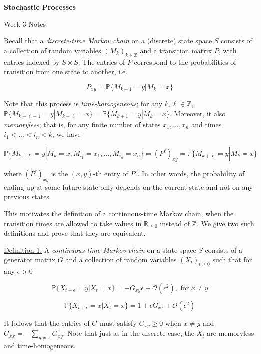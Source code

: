 \documentclass[10pt]{article}
\newcommand{\x}{\times}
\newcommand{\R}{\mathbb{R}}
\newcommand{\Z}{\mathbb{Z}}
\newcommand{\Prob}{\mathbb{P}}
\newcommand{\bigO}{\mathcal{O}}
\begin{document}
\begin{center}
\textbf{\Large Stochastic Processes}

{\large Week 3 Notes}
\end{center}

Recall that a \textit{discrete-time Markov chain} on a (discrete) state space $S$ consists of a collection of random variables $(M_k)_{k \in \Z}$ and a transition matrix $P$, with entries indexed by $S \x S$. The entries of $P$ correspond to the probabilities of transition from one state to another, i.e.

$$P_{xy}=\Prob\{M_{k+1}=y | M_k=x\}$$

Note that this process is \textit{time-homogeneous}; for any $k, \ell \in \Z$, $\Prob\{M_{k+\ell+1}=y | M_{k+\ell}=x\}=\Prob\{M_{k+1}=y | M_k=x\}$. Moreover, it also \textit{memoryless}; that is, for any finite number of states $x_1,...,x_n$ and times $i_1<...<i_n<k$, we have

$$\Prob\{M_{k+\ell}=y | M_k=x, M_{i_1}=x_1, ..., M_{i_n}=x_n\}=(P^\ell)_{xy}=\Prob\{M_{k+\ell}=y | M_k=x\}$$

where $(P^\ell)_{xy}$ is the $(x,y)$-th entry of $P^\ell$. In other words, the probability of ending up at some future state only depends on the current state and not on any previous states.

This motivates the definition of a continuous-time Markov chain, when the transition times are allowed to take values in $\R_{\geq 0}$ instead of $\Z$. We give two such definitions and prove that they are equivalent.

\hfill

\noindent \underline{Definition 1:} A \textit{continuous-time Markov chain} on a state space $S$ consists of a generator matrix $G$ and a collection of random variables $(X_t)_{t \geq 0}$ such that for any $\epsilon>0$

$$\Prob\{X_{t+\epsilon}=y | X_t=x \}=-G_{xy} \epsilon+\bigO(\epsilon^2), \text{     for } x \neq y$$

\begin{equation} \label{eq:def1}
\Prob\{X_{t+\epsilon}=x | X_t=x\}=1+\epsilon G_{xx}+\bigO(\epsilon^2)
\end{equation}

It follows that the entries of $G$ must satisfy $G_{xy} \geq 0$ when $x \neq y$ and $G_{xx}=-\sum_{y \neq x} G_{xy}$. Note that just as in the discrete case, the $X_t$ are memoryless and time-homogeneous.

\hfill
\end{document}
